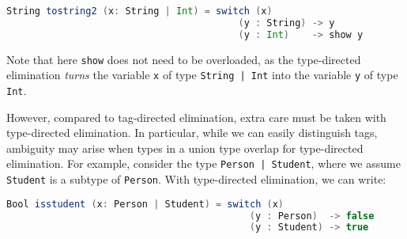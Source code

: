 \begin{lstlisting}[language=Scala]
  String tostring2 (x: String | Int) = switch (x)
                                         (y : String) -> y
                                         (y : Int)    -> show y
\end{lstlisting}

\noindent Note that here \lstinline{show} does not need to be overloaded,
as the type-directed elimination
\textit{turns} the variable \lstinline{x} of type \lstinline{String | Int} into
the variable \lstinline{y} of type \lstinline{Int}.

However, compared to tag-directed elimination, extra care must be taken with
type-directed elimination. In particular, while we can easily distinguish tags,
ambiguity may arise when types in a union type
overlap for type-directed elimination. For example, 
consider the type \lstinline{Person | Student}, where we
assume \lstinline{Student} is a subtype of \lstinline{Person}.
With type-directed
elimination, we can write:

\begin{comment}
\begin{lstlisting}
function isstudent (x: Person | Student) : Bool =
  switch (x)
     inj1 person  -> False
     inj2 student -> True
\end{lstlisting}

\noindent But if we transform this function straightforwardly to type-directed
elimination, we will get:
\end{comment}

\begin{lstlisting}[language=Scala]
  Bool isstudent (x: Person | Student) = switch (x)
                                           (y : Person)  -> false
                                           (y : Student) -> true
\end{lstlisting}

